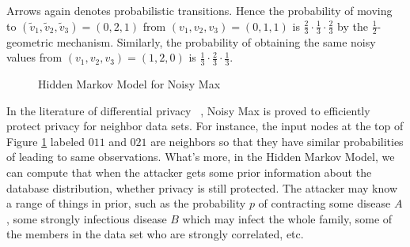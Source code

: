 Arrows again denotes probabilistic transitions. Hence the probability
of moving to $(\tilde{v}_1, \tilde{v}_2, \tilde{v}_3) = (0, 2, 1)$
from $(v_1, v_2, v_3) = (0, 1, 1)$ is $\frac{2}{3} \cdot \frac{1}{3}
\cdot \frac{2}{3}$ by the $\frac{1}{2}$-geometric
mechanism. Similarly, the probability of obtaining the same noisy
values from $(v_1, v_2, v_3) = (1, 2, 0)$ is $\frac{1}{3} \cdot
\frac{2}{3} \cdot \frac{1}{3}$.

\begin{figure}
  \centering
  \caption{Hidden Markov Model for Noisy Max}
  \label{figure:hmm-noisy-max}
\end{figure}

In the literature of differential privacy ~\cite{DR:14:AFDP,DWWZK:18:DVDP},
Noisy Max is proved to efficiently protect privacy for neighbor data sets. For instance, the input
nodes at the top of Figure \ref{figure:hmm-noisy-max} labeled $011$ and $021$ are neighbors
so that they have similar probabilities of leading to same observations. What's more,
in the Hidden Markov Model, we can compute that when the attacker gets some prior information
about the database distribution, whether privacy is still protected. The attacker may know
a range of things in prior, such as the probability $p$ of contracting some disease $A$,
some strongly infectious disease $B$ which may infect the whole family, some of the members in the
data set who are strongly correlated, etc.

